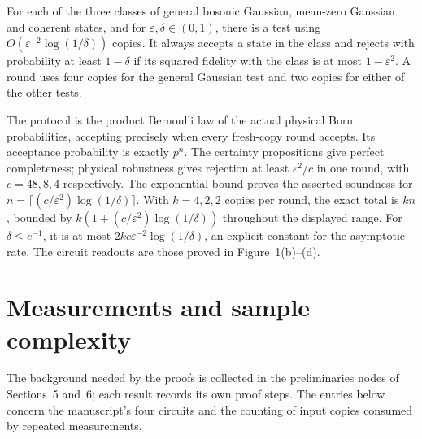 \begin{corollary}\label{cor:boson-testing}
  \par
  \leanok
  For each of the three classes of general bosonic Gaussian, mean-zero
  Gaussian and coherent states, and for $\varepsilon,\delta\in(0,1)$, there
  is a test using $O(\varepsilon^{-2}\log(1/\delta))$ copies. It always
  accepts a state in the class and rejects with probability at least
  $1-\delta$ if its squared fidelity with the class is at most
  $1-\varepsilon^2$. A round uses four copies for the general Gaussian test
  and two copies for either of the other tests.

  The protocol is the product Bernoulli law of the actual physical Born
  probabilities, accepting precisely when every fresh-copy round accepts.
  Its acceptance probability is exactly $p^n$. The certainty propositions
  give perfect completeness; physical robustness gives rejection at least
  $\varepsilon^2/c$ in one round, with $c=48,8,4$ respectively.
  The exponential bound proves the asserted soundness for
  $n=\lceil(c/\varepsilon^2)\log(1/\delta)\rceil$.
  With $k=4,2,2$ copies per round, the exact total is $kn$, bounded by
  $k(1+(c/\varepsilon^2)\log(1/\delta))$ throughout the displayed range.
  For $\delta\le e^{-1}$, it is at most
  $2kc\varepsilon^{-2}\log(1/\delta)$, an explicit constant for the
  asymptotic rate. The circuit readouts are those proved in Figure~1(b)--(d).
\end{corollary}

\chapter{Measurements and sample complexity}\label{sec:pending}

The background needed by the proofs is collected in the preliminaries nodes
of Sections~5 and~6; each result records its own proof steps. The entries below
concern the manuscript's four circuits and the counting of input copies
consumed by repeated measurements.

